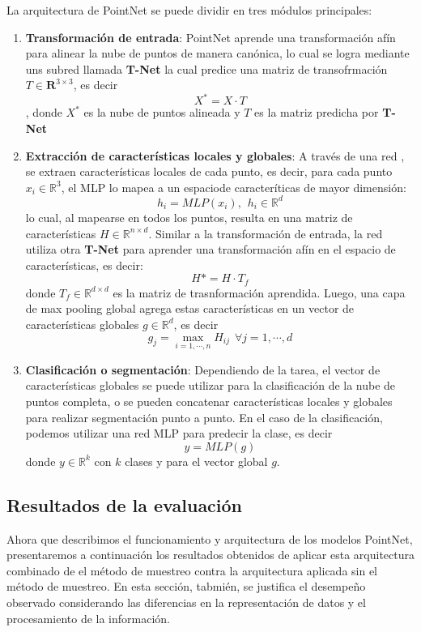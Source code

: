 La arquitectura de PointNet se puede dividir en tres módulos principales:

\begin{enumerate}
    \item \textbf{Transformación de entrada}: PointNet aprende una transformación afín para alinear la nube de puntos de manera canónica, lo cual se logra 
    mediante uns subred llamada \textbf{T-Net} la cual predice una matriz de transofrmación $T \in \mathbf{R}^{3 \times 3}$, es decir \[ X^{*} = X \cdot T\], donde
    $X^{*}$ es la nube de puntos alineada y $T$ es la matriz predicha por \textbf{T-Net}
    \item \textbf{Extracción de características locales y globales}: A través de una red , se extraen características locales de cada punto, es decir, para cada punto $x_i \in \mathbb{R}^3$,
     el MLP lo mapea a un espaciode caracteríticas de mayor dimensión: \[h_i = MLP(x_i) , \hspace{5pt} h_i \in \mathbb{R}^d\] 
     lo cual, al mapearse en todos los puntos, resulta en una matriz de características
    $H \in \mathbb{R}^{n \times d}$. Similar a la transformación de entrada, la red utiliza otra \textbf{T-Net} para aprender una transformación afín
    en el espacio de características, es decir: \[H* = H \cdot T_f\] donde $T_f \in \mathbb{R}^{d \times d}$ es la matriz de trasnformación aprendida.
    Luego, una capa de max pooling global agrega estas características en un vector de características globales $g \in \mathbb{R}^d$, es decir \[g_j = \max_{i = 1, \cdots ,n} H_{ij} \hspace{5pt} \forall j = 1, \cdots ,d \]
    \item \textbf{Clasificación o segmentación}: Dependiendo de la tarea, el vector de características globales se puede utilizar para la clasificación de la nube de puntos completa, o se pueden concatenar características locales y globales para realizar segmentación punto a punto.
    En el caso de la clasificación, podemos utilizar una red MLP para predecir la clase, es decir \[y = MLP(g)\] donde $y \in \mathbb{R}^k$ con $k$ clases y para el vector global $g$.

\end{enumerate}

\subsection{Resultados de la evaluación}

Ahora que describimos el funcionamiento y arquitectura de los modelos PointNet, presentaremos a continuación los resultados obtenidos de aplicar esta arquitectura combinado de el método de muestreo contra la arquitectura aplicada sin el método de muestreo. En esta sección, tabmién, se justifica el desempeño observado considerando las diferencias en la representación de datos y el procesamiento de la información.

